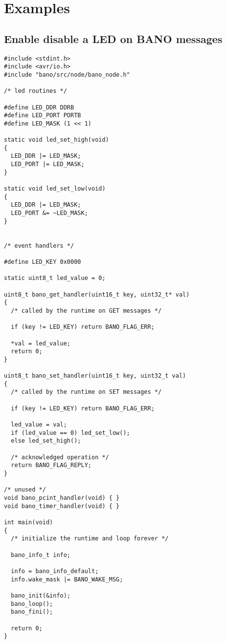 \documentclass[a4paper, 11pt]{article}
\begin{document}
\clearpage
\section{Examples}

\subsection{Enable disable a LED on BANO messages}
\begin{tiny}
\begin{verbatim}
#include <stdint.h>
#include <avr/io.h>
#include "bano/src/node/bano_node.h"

/* led routines */

#define LED_DDR DDRB
#define LED_PORT PORTB
#define LED_MASK (1 << 1)

static void led_set_high(void)
{
  LED_DDR |= LED_MASK;
  LED_PORT |= LED_MASK;
}

static void led_set_low(void)
{
  LED_DDR |= LED_MASK;
  LED_PORT &= ~LED_MASK;
}


/* event handlers */

#define LED_KEY 0x0000

static uint8_t led_value = 0;

uint8_t bano_get_handler(uint16_t key, uint32_t* val)
{
  /* called by the runtime on GET messages */

  if (key != LED_KEY) return BANO_FLAG_ERR;

  *val = led_value;
  return 0;
}

uint8_t bano_set_handler(uint16_t key, uint32_t val)
{
  /* called by the runtime on SET messages */

  if (key != LED_KEY) return BANO_FLAG_ERR;

  led_value = val;
  if (led_value == 0) led_set_low();
  else led_set_high();

  /* acknowledged operation */
  return BANO_FLAG_REPLY;
}

/* unused */
void bano_pcint_handler(void) { }
void bano_timer_handler(void) { }

int main(void)
{
  /* initialize the runtime and loop forever */

  bano_info_t info;

  info = bano_info_default;
  info.wake_mask |= BANO_WAKE_MSG;

  bano_init(&info);
  bano_loop();
  bano_fini();

  return 0;
}

\end{verbatim}
\end{tiny}
\end{document}
